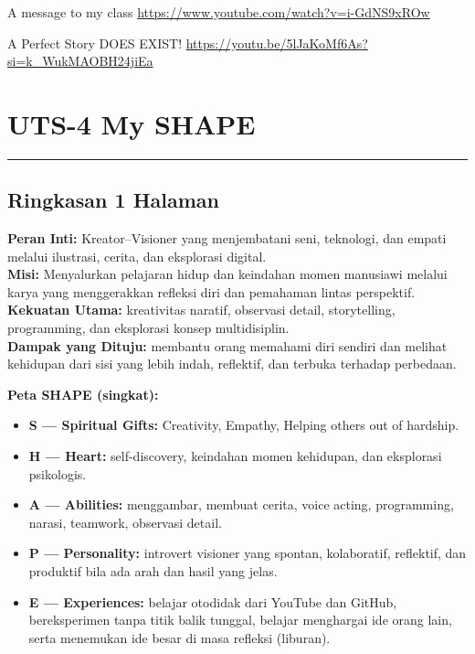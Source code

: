 \documentclass[
  letterpaper,
  DIV=11,
  numbers=noendperiod]{scrreprt}
\providecommand{\tightlist}{%
  \setlength{\itemsep}{0pt}\setlength{\parskip}{0pt}}
\begin{document}
A message to my class \url{https://www.youtube.com/watch?v=i-GdNS9xROw}

A Perfect Story DOES EXIST!
\url{https://youtu.be/5lJaKoMf6As?si=k_WukMAOBH24jiEa}


\chapter{UTS-4 My SHAPE}\label{uts-4-my-shape}

\begin{center}\rule{0.5\linewidth}{0.5pt}\end{center}

\section{Ringkasan 1 Halaman}\label{ringkasan-1-halaman}

\textbf{Peran Inti:} Kreator--Visioner yang menjembatani seni,
teknologi, dan empati melalui ilustrasi, cerita, dan eksplorasi
digital.\\
\textbf{Misi:} Menyalurkan pelajaran hidup dan keindahan momen manusiawi
melalui karya yang menggerakkan refleksi diri dan pemahaman lintas
perspektif.\\
\textbf{Kekuatan Utama:} kreativitas naratif, observasi detail,
storytelling, programming, dan eksplorasi konsep multidisiplin.\\
\textbf{Dampak yang Dituju:} membantu orang memahami diri sendiri dan
melihat kehidupan dari sisi yang lebih indah, reflektif, dan terbuka
terhadap perbedaan.

\textbf{Peta SHAPE (singkat):}

\begin{itemize}
\tightlist
\item
  \textbf{S --- Spiritual Gifts:} Creativity, Empathy, Helping others
  out of hardship.\\
\item
  \textbf{H --- Heart:} self-discovery, keindahan momen kehidupan, dan
  eksplorasi psikologis.\\
\item
  \textbf{A --- Abilities:} menggambar, membuat cerita, voice acting,
  programming, narasi, teamwork, observasi detail.\\
\item
  \textbf{P --- Personality:} introvert visioner yang spontan,
  kolaboratif, reflektif, dan produktif bila ada arah dan hasil yang
  jelas.\\
\item
  \textbf{E --- Experiences:} belajar otodidak dari YouTube dan GitHub,
  bereksperimen tanpa titik balik tunggal, belajar menghargai ide orang
  lain, serta menemukan ide besar di masa refleksi (liburan).
\end{itemize}
\end{document}
